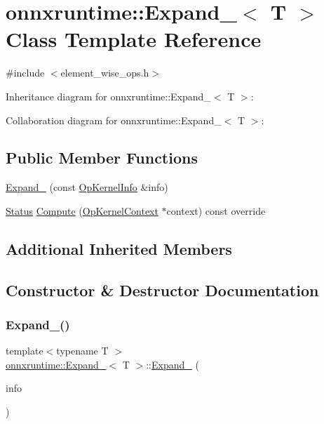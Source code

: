 \hypertarget{classonnxruntime_1_1Expand__8}{}\section{onnxruntime\+:\+:Expand\+\_$<$ T $>$ Class Template Reference}
\label{classonnxruntime_1_1Expand__8}


{\ttfamily \#include $<$element\+\_\+wise\+\_\+ops.\+h$>$}



Inheritance diagram for onnxruntime\+:\+:Expand\+\_$<$ T $>$\+:


Collaboration diagram for onnxruntime\+:\+:Expand\+\_$<$ T $>$\+:
\subsection*{Public Member Functions}
\begin{DoxyCompactItemize}
\item 
\mbox{\hyperlink{classonnxruntime_1_1Expand__8_ae15b82491cfc8aff836d8f625aebadb8}{Expand\+\_}} (const \mbox{\hyperlink{classonnxruntime_1_1OpKernelInfo}{Op\+Kernel\+Info}} \&info)
\item 
\mbox{\hyperlink{classonnxruntime_1_1common_1_1Status}{Status}} \mbox{\hyperlink{classonnxruntime_1_1Expand__8_ae3d9756b904c45ab9f6d5e9892027f0c}{Compute}} (\mbox{\hyperlink{classonnxruntime_1_1OpKernelContext}{Op\+Kernel\+Context}} $\ast$context) const override
\end{DoxyCompactItemize}
\subsection*{Additional Inherited Members}


\subsection{Constructor \& Destructor Documentation}
\mbox{\label{classonnxruntime_1_1Expand__8_ae15b82491cfc8aff836d8f625aebadb8}} 
\subsubsection{\texorpdfstring{Expand\+\_()}{Expand\_8()}}
{\footnotesize\ttfamily template$<$typename T $>$ \\
\mbox{\hyperlink{classonnxruntime_1_1Expand__8}{onnxruntime\+::\+Expand\+\_}}$<$ T $>$\+::\mbox{\hyperlink{classonnxruntime_1_1Expand__8}{Expand\+\_}} (\begin{DoxyParamCaption}\item[{const \mbox{\hyperlink{classonnxruntime_1_1OpKernelInfo}{Op\+Kernel\+Info}} \&}]{info }\end{DoxyParamCaption})\hspace{0.3cm}{\ttfamily [inline]}}



